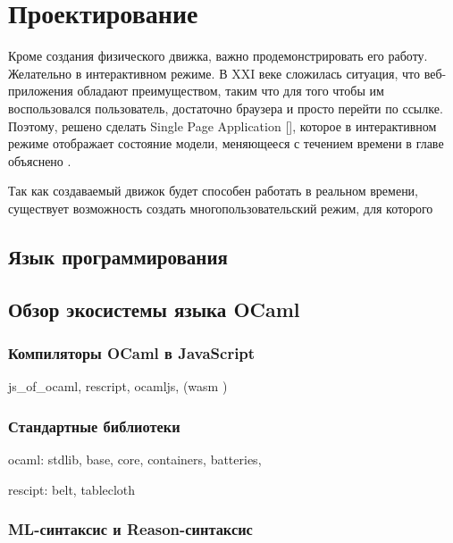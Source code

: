 \chapter{Проектирование}

\TODO

Кроме создания физического движка, важно продемонстрировать его работу. 
Желательно в интерактивном режиме. В XXI веке сложилась ситуация, что веб-приложения
обладают преимуществом, таким что для того чтобы им воспользовался пользователь, достаточно 
браузера и просто перейти по ссылке. 
Поэтому, решено сделать Single Page Application [\TODO], 
которое в интерактивном режиме отображает состояние модели, меняющееся с течением времени
в главе \TODO объяснено \TODO. 
 
Так как создаваемый движок будет способен работать в реальном времени, существует возможность
создать многопользовательский режим, для которого 



\section{Язык программирования}

\TODO

\section{Обзор экосистемы языка OCaml}

\TODO

\subsection{Компиляторы OCaml в JavaScript}

js\_of\_ocaml, rescript, ocamljs, (wasm \TODO) \TODO

\subsection{Стандартные библиотеки}

\TODO

ocaml: stdlib, base, core, containers, batteries, 

rescipt: belt, tablecloth

\subsection{ML-синтаксис и Reason-синтаксис}

